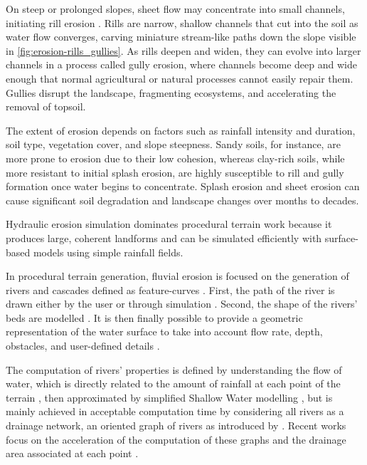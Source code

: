 On steep or prolonged slopes, sheet flow may concentrate into small channels, initiating rill erosion \cite{Gatto2000}. Rills are narrow, shallow channels that cut into the soil as water flow converges, carving miniature stream-like paths down the slope visible in \cref{fig:erosion-rills_gullies}. As rills deepen and widen, they can evolve into larger channels in a process called gully erosion, where channels become deep and wide enough that normal agricultural or natural processes cannot easily repair them. Gullies disrupt the landscape, fragmenting ecosystems, and accelerating the removal of topsoil.

The extent of erosion depends on factors such as rainfall intensity and duration, soil type, vegetation cover, and slope steepness. Sandy soils, for instance, are more prone to erosion due to their low cohesion, whereas clay-rich soils, while more resistant to initial splash erosion, are highly susceptible to rill and gully formation once water begins to concentrate. Splash erosion and sheet erosion can cause significant soil degradation and landscape changes over months to decades.

{}

Hydraulic erosion simulation dominates procedural terrain work because it produces large, coherent landforms and can be simulated efficiently with surface-based models using simple rainfall fields.

In procedural terrain generation, fluvial erosion is focused on the generation of rivers and cascades defined as feature-curves \cite{Emilien2015}. First, the path of the river is drawn either by the user \cite{Hnaidi2010} or through simulation \cite{ParisThesis}. Second, the shape of the rivers' beds are modelled \cite{Genevaux2013}. It is then finally possible to provide a geometric representation of the water surface to take into account flow rate, depth, obstacles, and user-defined details \cite{Peytavie2019}.

The computation of rivers' properties is defined by understanding the flow of water, which is directly related to the amount of rainfall at each point of the terrain \cite{Kelley1988}, then approximated by simplified Shallow Water modelling \cite{Mei2007}, but is mainly achieved in acceptable computation time by considering all rivers as a drainage network, an oriented graph of rivers as introduced by  \cite{Roudier1993}. Recent works focus on the acceleration of the computation of these graphs and the drainage area associated at each point \cite{Cordonnier2016,Schott2023}.


